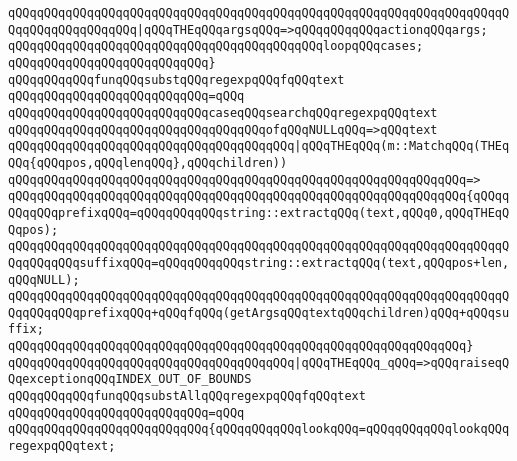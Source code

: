 \verb|qQQqqQQqqQQqqQQqqQQqqQQqqQQqqQQqqQQqqQQqqQQqqQQqqQQqqQQqqQQqqQQqqQQqqQQqqQQqqQQqqQQqqQQq|\verb#|qQQqTHEqQQqargsqQQq=>qQQqqQQqqQQqactionqQQqargs;#\newline
\newline
\verb|qQQqqQQqqQQqqQQqqQQqqQQqqQQqqQQqqQQqqQQqqQQqloopqQQqcases;|\newline
\verb|qQQqqQQqqQQqqQQqqQQqqQQqqQQq}|\newline
\newline
\verb|qQQqqQQqqQQqfunqQQqsubstqQQqregexpqQQqfqQQqtext|\newline
\verb|qQQqqQQqqQQqqQQqqQQqqQQqqQQq=qQQq|\newline
\verb|qQQqqQQqqQQqqQQqqQQqqQQqqQQqcaseqQQqsearchqQQqregexpqQQqtext|\newline
\newline
\verb|qQQqqQQqqQQqqQQqqQQqqQQqqQQqqQQqqQQqofqQQqNULLqQQq=>qQQqtext|\newline
\newline
\verb|qQQqqQQqqQQqqQQqqQQqqQQqqQQqqQQqqQQqqQQq|\verb#|qQQqTHEqQQq(m::MatchqQQq(THEqQQq{qQQqpos,qQQqlenqQQq},qQQqchildren))#\newline
\verb|qQQqqQQqqQQqqQQqqQQqqQQqqQQqqQQqqQQqqQQqqQQqqQQqqQQqqQQqqQQqqQQq=>|\newline
\verb|qQQqqQQqqQQqqQQqqQQqqQQqqQQqqQQqqQQqqQQqqQQqqQQqqQQqqQQqqQQqqQQq{qQQqqQQqqQQqprefixqQQq=qQQqqQQqqQQqstring::extractqQQq(text,qQQq0,qQQqTHEqQQqpos);|\newline
\verb|qQQqqQQqqQQqqQQqqQQqqQQqqQQqqQQqqQQqqQQqqQQqqQQqqQQqqQQqqQQqqQQqqQQqqQQqqQQqqQQqsuffixqQQq=qQQqqQQqqQQqstring::extractqQQq(text,qQQqpos+len,qQQqNULL);|\newline
\verb|qQQqqQQqqQQqqQQqqQQqqQQqqQQqqQQqqQQqqQQqqQQqqQQqqQQqqQQqqQQqqQQqqQQqqQQqqQQqqQQqprefixqQQq+qQQqfqQQq(getArgsqQQqtextqQQqchildren)qQQq+qQQqsuffix;|\newline
\verb|qQQqqQQqqQQqqQQqqQQqqQQqqQQqqQQqqQQqqQQqqQQqqQQqqQQqqQQqqQQqqQQq}|\newline
\verb|qQQqqQQqqQQqqQQqqQQqqQQqqQQqqQQqqQQqqQQq|\verb#|qQQqTHEqQQq_qQQq=>qQQqraiseqQQqexceptionqQQqINDEX_OUT_OF_BOUNDS#\newline
\newline
\verb|qQQqqQQqqQQqfunqQQqsubstAllqQQqregexpqQQqfqQQqtext|\newline
\verb|qQQqqQQqqQQqqQQqqQQqqQQqqQQq=qQQq|\newline
\verb|qQQqqQQqqQQqqQQqqQQqqQQqqQQq{qQQqqQQqqQQqlookqQQq=qQQqqQQqqQQqlookqQQqregexpqQQqtext;|\newline
\newline

